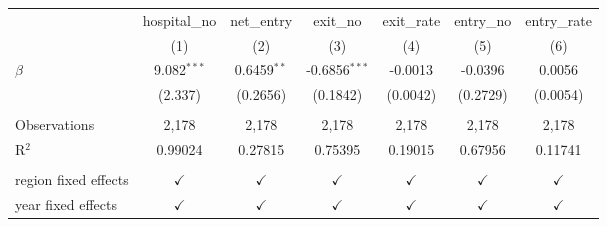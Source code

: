 \begingroup
\centering
\begin{tabular}{lcccccc}
   \toprule
                        & hospital\_no  & net\_entry    & exit\_no        & exit\_rate    & entry\_no     & entry\_rate\\   
                        & (1)           & (2)           & (3)             & (4)           & (5)           & (6)\\  
   \midrule 
   $\beta$              & 9.082$^{***}$ & 0.6459$^{**}$ & -0.6856$^{***}$ & -0.0013       & -0.0396       & 0.0056\\   
                        & (2.337)       & (0.2656)      & (0.1842)        & (0.0042)      & (0.2729)      & (0.0054)\\   
    \\
   Observations         & 2,178         & 2,178         & 2,178           & 2,178         & 2,178         & 2,178\\  
   R$^2$                & 0.99024       & 0.27815       & 0.75395         & 0.19015       & 0.67956       & 0.11741\\  
    \\
   region fixed effects & $\checkmark$  & $\checkmark$  & $\checkmark$    & $\checkmark$  & $\checkmark$  & $\checkmark$\\   
   year fixed effects   & $\checkmark$  & $\checkmark$  & $\checkmark$    & $\checkmark$  & $\checkmark$  & $\checkmark$\\   
   \bottomrule
\end{tabular}
\par\endgroup
